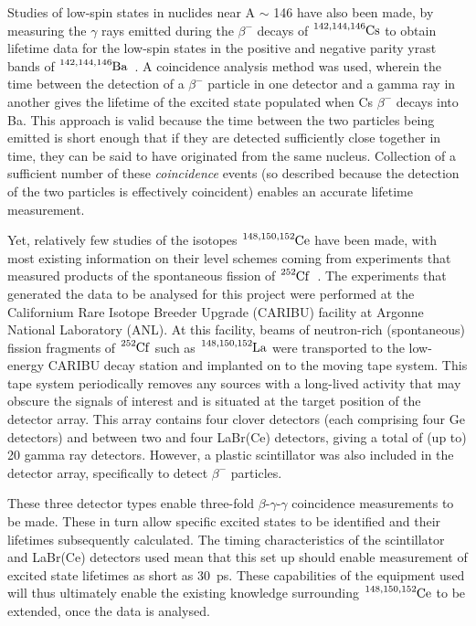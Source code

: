 \documentclass[12pt,a4paper]{article}
\begin{document}
\medskip
\noindent
Studies of low-spin states in nuclides near A $\sim$ 146 have also been made, by measuring the $\gamma$ rays emitted during the $\beta^-$ decays of $\ce{^{142,144,146}Cs}$ to obtain lifetime data for the low-spin states in the positive and negative parity yrast bands of $\ce{^{142,144,146}Ba}$~\cite{mach_influence_1990}.
A coincidence analysis method was used, wherein the time between the detection of a $\beta^-$ particle in one detector and a gamma ray in another gives the lifetime of the excited state populated when Cs $\beta^-$ decays into Ba.
This approach is valid because the time between the two particles being emitted is short enough that if they are detected sufficiently close together in time, they can be said to have originated from the same nucleus.
Collection of a sufficient number of these \textit{coincidence} events (so described because the detection of the two particles is effectively coincident) enables an accurate lifetime measurement.

\medskip
\noindent
Yet, relatively few studies of the isotopes $\ce{^{148,150,152}Ce}$ have been made, with most existing information on their level schemes coming from experiments that measured products of the spontaneous fission of $\ce{^{252}Cf}$~\cite{nica_notitle_117,
martin_notitle_114,
bazu_notitle_114}.
The experiments that generated the data to be analysed for this project were performed at the Californium Rare Isotope Breeder Upgrade (CARIBU) facility at Argonne National Laboratory (ANL).
At this facility, beams of neutron-rich (spontaneous) fission fragments of $\ce{^{252}Cf}$ such as $\ce{^{148,150,152}La}$ were transported to the low-energy CARIBU decay station and implanted on to the moving tape system.
This tape system periodically removes any sources with a long-lived activity that may obscure the signals of interest and is situated at the target position of the detector array.
This array contains four clover detectors (each comprising four Ge detectors) and between two and four LaBr(Ce) detectors, giving a total of (up to) 20 gamma ray detectors.
However, a plastic scintillator was also included in the detector array, specifically to detect $\beta^-$ particles.

\medskip
\noindent
These three detector types enable three-fold $\beta$-$\gamma$-$\gamma$ coincidence measurements to be made.
These in turn allow specific excited states to be identified and their lifetimes subsequently calculated.
The timing characteristics of the scintillator and LaBr(Ce) detectors used mean that this set up should enable measurement of excited state lifetimes as short as 30~ps.
These capabilities of the equipment used will thus ultimately enable the existing knowledge surrounding $\ce{^{148,150,152}Ce}$ to be extended, once the data is analysed.
\end{document}

